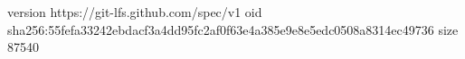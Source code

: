 version https://git-lfs.github.com/spec/v1
oid sha256:55fefa33242ebdacf3a4dd95fc2af0f63e4a385e9e8e5edc0508a8314ec49736
size 87540
